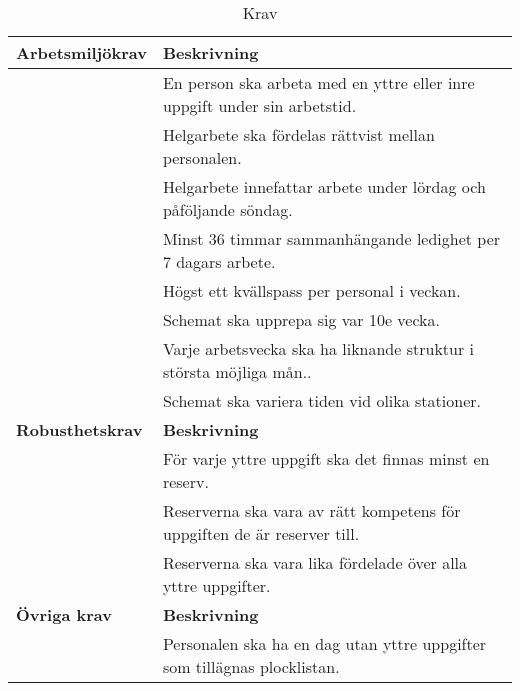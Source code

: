 \begin{table}[H]
\caption{Krav}
\label{int:3}
\begin{tabular}{|l|l|}
\hline
\textbf{Arbetsmiljökrav} & \textbf{Beskrivning} \\ \hline
& En person ska arbeta med en yttre eller inre uppgift under sin arbetstid.
\\ \hline 
 & Helgarbete ska fördelas rättvist mellan personalen. 
\\ \hline 
 & Helgarbete innefattar arbete under lördag och påföljande söndag.
\\ \hline 
 & Minst 36 timmar sammanhängande ledighet per 7 dagars arbete.
\\ \hline 
 & Högst ett kvällspass per personal i veckan.
\\ \hline 
 & Schemat ska upprepa sig var 10e vecka.
\\ \hline 
 & Varje arbetsvecka ska ha liknande struktur i största möjliga mån..
\\ \hline 
 & Schemat ska variera tiden vid olika stationer.
\\ \hline 

\textbf{Robusthetskrav} & \textbf{Beskrivning} \\ \hline
 & För varje yttre uppgift ska det finnas minst en reserv.
\\ \hline 
 & Reserverna ska vara av rätt kompetens för uppgiften de är reserver till.
\\ \hline 
 & Reserverna ska vara lika fördelade över alla yttre uppgifter.
\\ \hline 

\textbf{Övriga krav} & \textbf{Beskrivning} \\ \hline
 & Personalen ska ha en dag utan yttre uppgifter som tillägnas plocklistan.
\\ \hline 
\end{tabular}
\end{table}
\medskip


